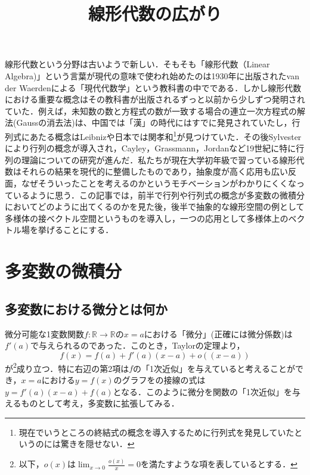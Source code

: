 \documentclass{jsarticle}
\title{線形代数の広がり}
\def\realnum{{\mathbb R}}
\begin{document}
\maketitle
線形代数という分野は古いようで新しい．そもそも「線形代数（Linear Algebra)」という言葉が現代の意味で使われ始めたのは1930年に出版されたvan der Waerdenによる「現代代数学」という教科書の中でである．しかし線形代数における重要な概念はその教科書が出版されるずっと以前から少しずつ発明されていた．例えば，未知数の数と方程式の数が一致する場合の連立一次方程式の解法(Gaussの消去法)は、中国では「漢」の時代にはすでに発見されていたし，行列式にあたる概念はLeibnizや日本では関孝和\footnote{現在でいうところの終結式の概念を導入するために行列式を発見していたというのには驚きを隠せない．}が見つけていた．その後Sylvesterにより行列の概念が導入され，Cayley，Grassmann，Jordanなど19世紀に特に行列の理論についての研究が進んだ．私たちが現在大学初年級で習っている線形代数はそれらの結果を現代的に整備したものであり，抽象度が高く応用も広い反面，なぜそういったことを考えるのかというモチベーションがわかりにくくなっているように思う．この記事では，前半で行列や行列式の概念が多変数の微積分においてどのように出てくるのかを見た後，後半で抽象的な線形空間の例として多様体の接ベクトル空間というものを導入し，一つの応用として多様体上のベクトル場を挙げることにする．

\section{多変数の微積分}
\subsection{多変数における微分とは何か}
微分可能な1変数関数$f:\realnum\rightarrow\realnum$の$x=a$における「微分」(正確には微分係数)は$f'(a)$で与えられるのであった．このとき，Taylorの定理より，
$$
f(x)=f(a)+f'(a)(x-a)+o((x-a))
$$
が\footnote{以下，$o(x)$は$\lim_{x\rightarrow 0}\frac{o(x)}{x}=0$を満たすような項を表しているとする．}成り立つ．特に右辺の第2項は$f$の「1次近似」を与えていると考えることができ，$x=a$における$y=f(x)$のグラフをの接線の式は$y=f'(a)(x-a)+f(a)$となる．このように微分を関数の「1次近似」を与えるものとして考え，多変数に拡張してみる．
\end{document}
